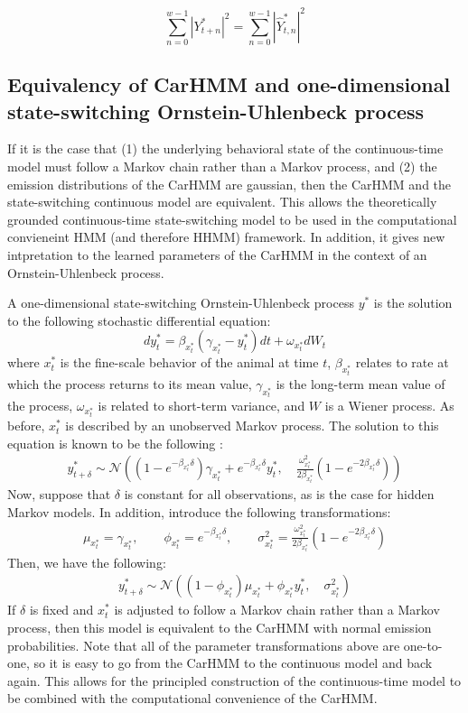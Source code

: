 $$\sum_{n = 0}^{w-1} |Y^*_{t+n}|^2 = \sum_{n = 0}^{w-1} |\hat{Y}^*_{t,n}|^2$$

\subsection{Equivalency of CarHMM and one-dimensional state-switching Ornstein-Uhlenbeck process}

If it is the case that (1) the underlying behavioral state of the continuous-time model must follow a Markov chain rather than a Markov process, and (2) the emission distributions of the CarHMM are gaussian, then the CarHMM and the state-switching continuous model are equivalent. This allows the theoretically grounded continuous-time state-switching model to be used in the computational convieneint HMM (and therefore HHMM) framework. In addition, it gives new intpretation to the learned parameters of the CarHMM in the context of an Ornstein-Uhlenbeck process.

A one-dimensional state-switching Ornstein-Uhlenbeck process $y^*$ is the solution to the following stochastic differential equation:
%
$$dy^*_t = \beta_{x^*_t}(\gamma_{x^*_t} - y^*_t)dt + \omega_{x^*_t} dW_t$$
%
where $x^*_t$ is the fine-scale behavior of the animal at time $t$, $\beta_{x^*_t}$ relates to rate at which the process returns to its mean value, $\gamma_{x^*_t}$ is the long-term mean value of the process, $\omega_{x^*_t}$ is related to short-term variance, and $W$ is a Wiener process. As before, $x^*_t$ is described by an unobserved Markov process. The solution to this equation is known to be the following \cite{Michelot:2019}:
\begin{align*}
y^*_{t+\delta} \sim \mathcal{N}\left((1-e^{-\beta_{x^*_t}\delta})\gamma_{x^*_t} + e^{-\beta_{x^*_t}\delta} y^*_t,\quad \frac{\omega_{x^*_t}^2}{2\beta_{x^*_t}} (1-e^{-2\beta_{x^*_t}\delta})\right)
\end{align*}
Now, suppose that $\delta$ is constant for all observations, as is the case for hidden Markov models. In addition, introduce the following transformations:
\begin{align*}
\mu_{x^*_t} = \gamma_{x^*_t}, \qquad \phi_{x^*_t} = e^{-\beta_{x^*_t}\delta}, \qquad \sigma^2_{x^*_t} = \frac{\omega_{x^*_t}^2}{2\beta_{x^*_t}} (1-e^{-2\beta_{x^*_t}\delta})
\end{align*}
Then, we have the following:
\begin{align*}
y^*_{t+\delta} \sim \mathcal{N}\left((1-\phi_{x^*_t})\mu_{x^*_t} + \phi_{x^*_t} y^*_t,\quad \sigma_{x^*_t}^2 \right)
\end{align*}
%
If $\delta$ is fixed and $x^*_t$ is adjusted to follow a Markov chain rather than a Markov process, then this model is equivalent to the CarHMM with normal emission probabilities. Note that all of the parameter transformations above are one-to-one, so it is easy to go from the CarHMM to the continuous model and back again. This allows for the principled construction of the continuous-time model to be combined with the computational convenience of the CarHMM.

\fi
